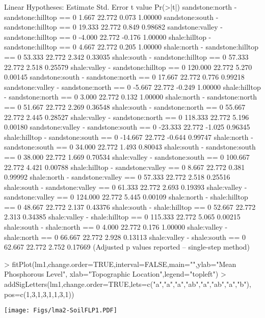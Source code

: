 \documentclass{article}
\begin{document}
\begin{Schunk}
\begin{Soutput}
Linear Hypotheses:
                                          Estimate Std. Error t value Pr(>|t|)
sandstone:north - sandstone:hilltop == 0     1.667     22.772   0.073  1.00000
sandstone:south - sandstone:hilltop == 0    19.333     22.772   0.849  0.98682
sandstone:valley - sandstone:hilltop == 0   -4.000     22.772  -0.176  1.00000
shale:hilltop - sandstone:hilltop == 0       4.667     22.772   0.205  1.00000
shale:north - sandstone:hilltop == 0        53.333     22.772   2.342  0.33035
shale:south - sandstone:hilltop == 0        57.333     22.772   2.518  0.25579
shale:valley - sandstone:hilltop == 0      120.000     22.772   5.270  0.00145
sandstone:south - sandstone:north == 0      17.667     22.772   0.776  0.99218
sandstone:valley - sandstone:north == 0     -5.667     22.772  -0.249  1.00000
shale:hilltop - sandstone:north == 0         3.000     22.772   0.132  1.00000
shale:north - sandstone:north == 0          51.667     22.772   2.269  0.36548
shale:south - sandstone:north == 0          55.667     22.772   2.445  0.28527
shale:valley - sandstone:north == 0        118.333     22.772   5.196  0.00180
sandstone:valley - sandstone:south == 0    -23.333     22.772  -1.025  0.96345
shale:hilltop - sandstone:south == 0       -14.667     22.772  -0.644  0.99747
shale:north - sandstone:south == 0          34.000     22.772   1.493  0.80043
shale:south - sandstone:south == 0          38.000     22.772   1.669  0.70534
shale:valley - sandstone:south == 0        100.667     22.772   4.421  0.00788
shale:hilltop - sandstone:valley == 0        8.667     22.772   0.381  0.99992
shale:north - sandstone:valley == 0         57.333     22.772   2.518  0.25516
shale:south - sandstone:valley == 0         61.333     22.772   2.693  0.19393
shale:valley - sandstone:valley == 0       124.000     22.772   5.445  0.00109
shale:north - shale:hilltop == 0            48.667     22.772   2.137  0.43376
shale:south - shale:hilltop == 0            52.667     22.772   2.313  0.34385
shale:valley - shale:hilltop == 0          115.333     22.772   5.065  0.00215
shale:south - shale:north == 0               4.000     22.772   0.176  1.00000
shale:valley - shale:north == 0             66.667     22.772   2.928  0.13113
shale:valley - shale:south == 0             62.667     22.772   2.752  0.17669
(Adjusted p values reported -- single-step method)
\end{Soutput}
\end{Schunk}

\begin{Schunk}
\begin{Sinput}
> fitPlot(lm1,change.order=TRUE,interval=FALSE,main="",ylab="Mean Phosphorous Level",
  xlab="Topographic Location",legend="topleft")
> addSigLetters(lm1,change.order=TRUE,lets=c("a","a","a","ab","a","ab","a","b"),
  pos=c(1,3,1,3,1,1,3,1))
\end{Sinput}
\end{Schunk}
\texttt{[image: Figs/lma2-SoilFLP1.PDF]}
\end{document}
